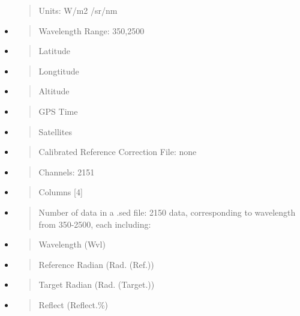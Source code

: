 \documentclass[
]{article}
\begin{document}
\begin{itemize}
  \begin{quote}
  Units: W/m2 /sr/nm
  \end{quote}
\item
  \begin{quote}
  Wavelength Range: 350,2500
  \end{quote}
\item
  \begin{quote}
  Latitude
  \end{quote}
\item
  \begin{quote}
  Longtitude
  \end{quote}
\item
  \begin{quote}
  Altitude
  \end{quote}
\item
  \begin{quote}
  GPS Time
  \end{quote}
\item
  \begin{quote}
  Satellites
  \end{quote}
\item
  \begin{quote}
  Calibrated Reference Correction File: none
  \end{quote}
\item
  \begin{quote}
  Channels: 2151
  \end{quote}
\item
  \begin{quote}
  Columns {[}4{]}
  \end{quote}
\end{itemize}

\begin{itemize}
\item
  \begin{quote}
  Number of data in a .sed file: 2150 data, corresponding to wavelength
  from 350-2500, each including:
  \end{quote}
\end{itemize}

\begin{itemize}
\item
  \begin{quote}
  Wavelength (Wvl)
  \end{quote}
\item
  \begin{quote}
  Reference Radian (Rad. (Ref.))
  \end{quote}
\item
  \begin{quote}
  Target Radian (Rad. (Target.))
  \end{quote}
\item
  \begin{quote}
  Reflect (Reflect.\%)
  \end{quote}
\end{itemize}
\end{document}
